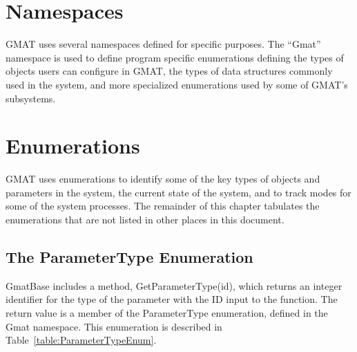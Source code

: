 \section{\label{section:Namespaces}Namespaces}

GMAT uses several namespaces defined for specific purposes.  The ``Gmat'' namespace is used to
define program specific enumerations defining the types of objects users can configure in GMAT, the
types of data structures commonly used in the system, and more specialized enumerations used by
some of GMAT's subsystems.

\section{\label{section:Enumerations}Enumerations}

GMAT uses enumerations to identify some of the key types of objects and parameters in the system,
the current state of the system, and to track modes for some of the system processes.  The
remainder of this chapter tabulates the enumerations that are not listed in other places in this
document.

\subsection{The ParameterType Enumeration}

GmatBase includes a method, GetParameterType(id), which returns an integer identifier for the type
of the parameter with the ID input to the function.  The return value is a member of the
ParameterType enumeration, defined in the Gmat namespace.  This enumeration is described in
Table~\ref{table:ParameterTypeEnum}.

